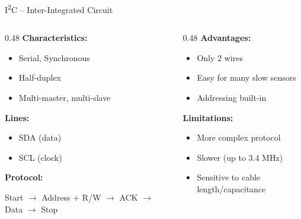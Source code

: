 \documentclass[aspectratio=169,11pt]{beamer}
\begin{document}
\begin{frame}{I\textsuperscript{2}C -- Inter-Integrated Circuit}
    \begin{columns}[T]
        \begin{column}{0.48\textwidth}
            \textbf{Characteristics:}
            \begin{itemize}
                \item Serial, Synchronous
                \item Half-duplex
                \item Multi-master, multi-slave
            \end{itemize}
            
            \vspace{0.3cm}
            \textbf{Lines:}
            \begin{itemize}
                \item SDA (data)
                \item SCL (clock)
            \end{itemize}
            
            \vspace{0.3cm}
            \textbf{Protocol:}
            
            Start $\rightarrow$ Address + R/W $\rightarrow$ ACK $\rightarrow$ Data $\rightarrow$ Stop
        \end{column}
        \begin{column}{0.48\textwidth}
            \textbf{Advantages:}
            \begin{itemize}
                \item Only 2 wires
                \item Easy for many slow sensors
                \item Addressing built-in
            \end{itemize}
            
            \vspace{0.3cm}
            \textbf{Limitations:}
            \begin{itemize}
                \item More complex protocol
                \item Slower (up to 3.4 MHz)
                \item Sensitive to cable length/capacitance
            \end{itemize}
        \end{column}
    \end{columns}
    
    \vspace{0.3cm}
    \footnotesize
    \cite{pallasareny2012sensors}
\end{frame}
\end{document}
